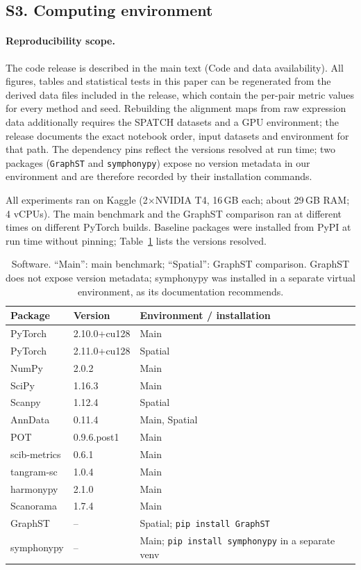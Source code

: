 \subsection*{S3. Computing environment}
\paragraph{Reproducibility scope.} The code release is described in the main text (Code and data availability). All figures, tables and statistical tests in this
paper can be regenerated from the derived data files included in the release, which contain
the per-pair metric values for every method and seed. Rebuilding the alignment maps from raw
expression data additionally requires the SPATCH datasets and a GPU environment; the release
documents the exact notebook order, input datasets and environment for that path. The
dependency pins reflect the versions resolved at run time; two packages (\texttt{GraphST} and
\texttt{symphonypy}) expose no version metadata in our environment and are therefore recorded
by their installation commands.

All experiments ran on Kaggle (2$\times$NVIDIA T4, 16\,GB each; about 29\,GB RAM; 4 vCPUs). The main benchmark and
the GraphST comparison ran at different times on different PyTorch builds. Baseline packages were installed from PyPI
at run time without pinning; Table~\ref{tab:software} lists the versions resolved.

\begin{table}[htbp]
\centering
\caption{Software. ``Main'': main benchmark; ``Spatial'': GraphST comparison. GraphST does not expose version
metadata; symphonypy was installed in a separate virtual environment, as its documentation recommends.}
\label{tab:software}
\begin{tabular}{@{}lll@{}}
\toprule
Package & Version & Environment / installation \\
\midrule
PyTorch      & 2.10.0+cu128 & Main \\
PyTorch      & 2.11.0+cu128 & Spatial \\
NumPy        & 2.0.2        & Main \\
SciPy        & 1.16.3       & Main \\
Scanpy       & 1.12.4       & Spatial \\
AnnData      & 0.11.4       & Main, Spatial \\
POT          & 0.9.6.post1  & Main \\
scib-metrics & 0.6.1        & Main \\
tangram-sc   & 1.0.4        & Main \\
harmonypy    & 2.1.0        & Main \\
Scanorama    & 1.7.4        & Main \\
GraphST      & --           & Spatial; \texttt{pip install GraphST} \\
symphonypy   & --           & Main; \texttt{pip install symphonypy} in a separate venv \\
\bottomrule
\end{tabular}
\end{table}

